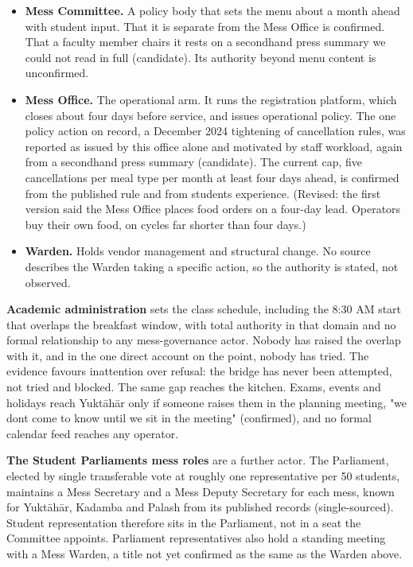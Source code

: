 \documentclass[
  10pt,
  table]{article}
\providecommand{\tightlist}{%
  \setlength{\itemsep}{0pt}\setlength{\parskip}{0pt}}
\renewcommand{\tightlist}{\setlength{\itemsep}{1.5pt}\setlength{\parskip}{0pt}}
\begin{document}
\begin{itemize}
\tightlist
\item
  \textbf{Mess Committee.} A policy body that sets the menu about a month ahead with student input. That it is separate from the Mess Office is confirmed. That a faculty member chairs it rests on a secondhand press summary we could not read in full (candidate). Its authority beyond menu content is unconfirmed.
\item
  \textbf{Mess Office.} The operational arm. It runs the registration platform, which closes about four days before service, and issues operational policy. The one policy action on record, a December 2024 tightening of cancellation rules, was reported as issued by this office alone and motivated by staff workload, again from a secondhand press summary (candidate). The current cap, five cancellations per meal type per month at least four days ahead, is confirmed from the published rule and from students\textquotesingle{} experience. (Revised: the first version said the Mess Office places food orders on a four-day lead. Operators buy their own food, on cycles far shorter than four days.)
\item
  \textbf{Warden.} Holds vendor management and structural change. No source describes the Warden taking a specific action, so the authority is stated, not observed.
\end{itemize}

\textbf{Academic administration} sets the class schedule, including the 8:30 AM start that overlaps the breakfast window, with total authority in that domain and no formal relationship to any mess-governance actor. Nobody has raised the overlap with it, and in the one direct account on the point, nobody has tried. The evidence favours inattention over refusal: the bridge has never been attempted, not tried and blocked. The same gap reaches the kitchen. Exams, events and holidays reach Yuktāhār only if someone raises them in the planning meeting, "we don\textquotesingle t come to know until we sit in the meeting" (confirmed), and no formal calendar feed reaches any operator.

\textbf{The Student Parliament\textquotesingle s mess roles} are a further actor. The Parliament, elected by single transferable vote at roughly one representative per 50 students, maintains a Mess Secretary and a Mess Deputy Secretary for each mess, known for Yuktāhār, Kadamba and Palash from its published records (single-sourced). Student representation therefore sits in the Parliament, not in a seat the Committee appoints. Parliament representatives also hold a standing meeting with a Mess Warden, a title not yet confirmed as the same as the Warden above.
\end{document}
